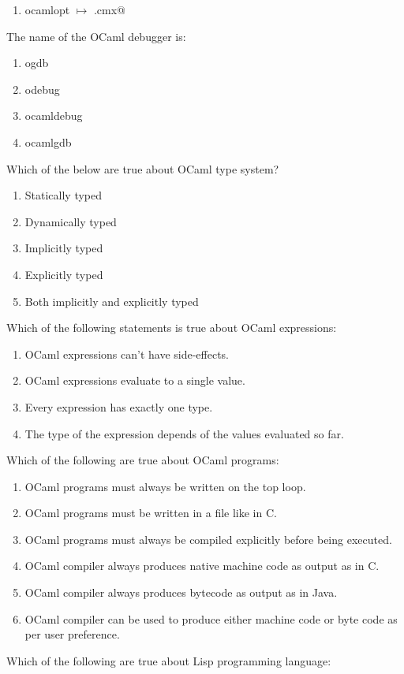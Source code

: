 \documentclass[addpoints,11pt]{exam}
\begin{document}
\begin{questions}
\begin{enumerate}
\item ocamlopt $\mapsto$ \lstinline@program.cmx@
\end{enumerate}\question The name of the OCaml debugger is:
\begin{enumerate}
\item ogdb
\item odebug
\item ocamldebug
\item ocamlgdb
\end{enumerate}\question Which of the below are true about OCaml type system?
\begin{enumerate}
  \item Statically typed
  \item Dynamically typed
  \item Implicitly typed
  \item Explicitly typed
  \item Both implicitly and explicitly typed
\end{enumerate} 
\question Which of the following statements is true about OCaml expressions:
\begin{enumerate}
\item OCaml expressions can't have side-effects.
\item OCaml expressions evaluate to a single value.
\item Every expression has exactly one type.
\item The type of the expression depends of the values evaluated so far.
\end{enumerate}\question Which of the following are true about OCaml programs:
\begin{enumerate}
\item OCaml programs must always be written on the top loop.
\item OCaml programs must be written in a file like in C.
\item OCaml programs must always be compiled explicitly before being executed.
\item OCaml compiler always produces native machine code as output as in C.
\item OCaml compiler always produces bytecode as output as in Java.
\item OCaml compiler can be used to produce either machine code or byte code as per user preference.
\end{enumerate}\question Which of the following are true about Lisp programming language:
\begin{enumerate}

\end{enumerate}
\end{questions}
\end{document}
